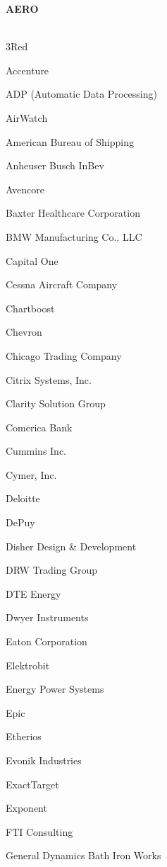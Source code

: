 \documentclass[twoside]{article}
\begin{document}
    \begin{center}\begin{multicols}{5}
    {\fontsize{14}{16}\selectfont \bf AERO}\\
        \vspace{-1em}
        ~\hrulefill~
        \vspace{-.9em}
        \begin{FlushLeft}
        \begin{compactitem}
        \item 3Red
\item Accenture
\item ADP (Automatic Data Processing)
\item AirWatch
\item American Bureau of Shipping
\item Anheuser Busch InBev
\item Avencore
\item Baxter Healthcare Corporation
\item BMW Manufacturing Co., LLC
\item Capital One
\item Cessna Aircraft Company
\item Chartboost
\item Chevron
\item Chicago Trading Company
\item Citrix Systems, Inc.
\item Clarity Solution Group
\item Comerica Bank
\item Cummins Inc.
\item Cymer, Inc.
\item Deloitte
\item DePuy
\item Disher Design \& Development
\item DRW Trading Group
\item DTE Energy
\item Dwyer Instruments
\item Eaton Corporation
\item Elektrobit
\item Energy Power Systems
\item Epic
\item Etherios
\item Evonik Industries
\item ExactTarget
\item Exponent
\item FTI Consulting
\item General Dynamics Bath Iron Works

\end{compactitem}
\end{FlushLeft}
\end{multicols}
\end{center}
\end{document}
